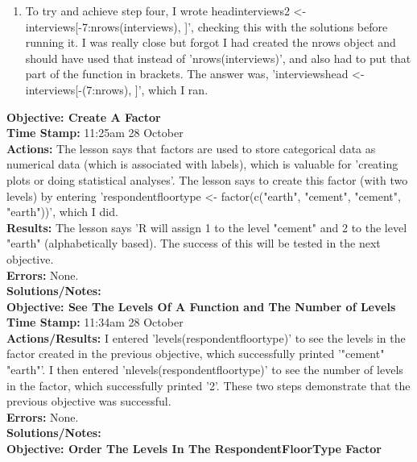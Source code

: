 \documentclass{article}
\begin{document}
\begin{FlushLeft}
\begin{enumerate}
    \item To try and achieve step four, I wrote head\textunderscore interviews2 \textless - interviews[-7:nrows(interviews), ]', checking this with the solutions before running it. I was really close but forgot I had created the n\textunderscore rows object and should have used that instead of 'nrows(interviews)', and also had to put that part of the function in brackets. The answer was, 'interviews\textunderscore head \textless - interviews[-(7:n\textunderscore rows), ]', which I ran.
\end{enumerate}
\vspace{5mm}
\textbf{Objective: Create A Factor}\\ 
\textbf{Time Stamp:} 11:25am 28 October\\
\textbf{Actions:} The lesson says that factors are used to store categorical data as numerical data (which is associated with labels), which is valuable for 'creating plots or doing statistical analyses'. The lesson says to create this factor (with two levels) by entering 'respondent\textunderscore floor\textunderscore type \textless - factor(c("earth", "cement", "cement", "earth"))', which I did.\\
\textbf{Results:} The lesson says 'R will assign 1 to the level "cement" and 2 to the level "earth" (alphabetically based). The success of this will be tested in the next objective.\\
\textbf{Errors:} None.\\
\textbf{Solutions/Notes:}\\
\vspace{5mm}
\textbf{Objective: See The Levels Of A Function and The Number of Levels}\\ 
\textbf{Time Stamp:} 11:34am 28 October\\
\textbf{Actions/Results:} I entered 'levels(respondent\textunderscore floor\textunderscore type)' to see the levels in the factor created in the previous objective, which successfully printed '"cement" "earth"'. I then entered 'nlevels(respondent\textunderscore floor\textunderscore type)' to see the number of levels in the factor, which successfully printed '2'. These two steps demonstrate that the previous objective was successful.\\
\textbf{Errors:} None.\\
\textbf{Solutions/Notes:}\\
\vspace{5mm}
\textbf{Objective: Order The Levels In The Respondent\textunderscore Floor\textunderscore Type Factor}\\ 

\end{FlushLeft}
\end{document}
